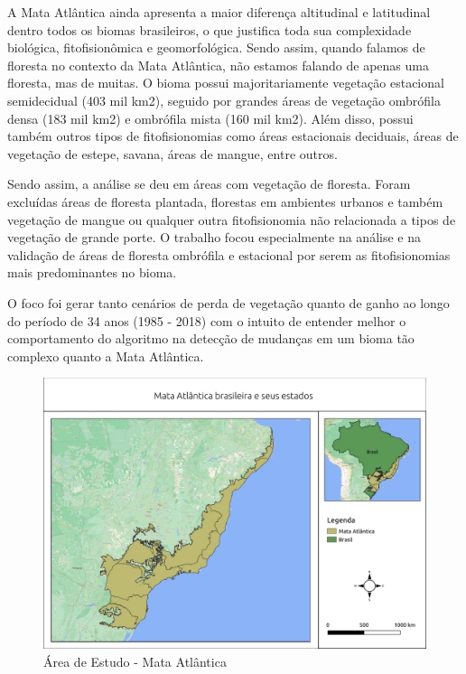 A Mata Atlântica ainda apresenta a maior diferença altitudinal e latitudinal dentro todos os biomas brasileiros, o que justifica toda sua complexidade biológica, fitofisionômica e geomorfológica. Sendo assim, quando falamos de floresta no contexto da Mata Atlântica, não estamos falando de apenas uma floresta, mas de muitas. O bioma possui majoritariamente vegetação estacional semidecidual (403 mil km2), seguido por grandes áreas de vegetação ombrófila densa (183 mil km2) e ombrófila mista (160 mil km2). Além disso, possui também outros tipos de fitofisionomias como áreas estacionais deciduais, áreas de vegetação de estepe, savana, áreas de mangue, entre outros. 

Sendo assim, a análise se deu em áreas com vegetação de floresta. Foram excluídas áreas de floresta plantada, florestas em ambientes urbanos e também vegetação de mangue ou qualquer outra fitofisionomia não relacionada a tipos de vegetação de grande porte. O trabalho focou especialmente na análise e na validação de áreas de floresta ombrófila e estacional por serem as fitofisionomias mais predominantes no bioma.

O foco foi gerar tanto cenários de perda de vegetação quanto de ganho ao longo do período de 34 anos (1985 - 2018) com o intuito de entender melhor o comportamento do algoritmo na detecção de mudanças em um bioma tão complexo quanto a Mata Atlântica. 

\begin{figure}[h!]
    \centering
    \includegraphics[scale=.5]{images/mata_atlantica.pdf}
    \caption{Área de Estudo - Mata Atlântica}
    \label{fig:mata_atlantica}
\end{figure}

